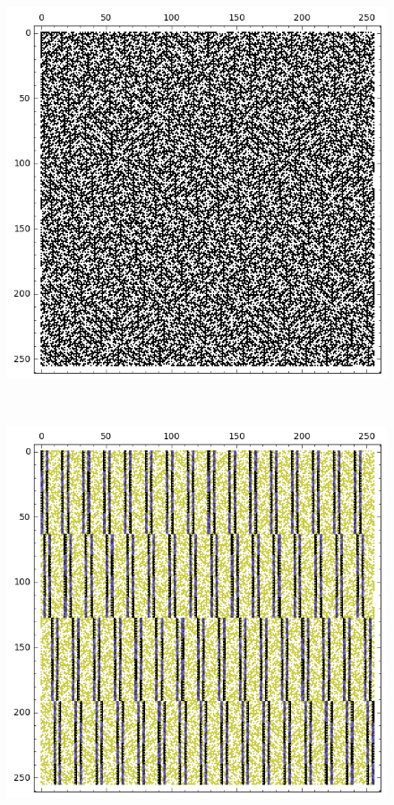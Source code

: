 \documentclass[12pt,a4paper]{article}
\begin{document}
\begin{figure}[!bhpt] %
\centering
\begin{minipage}{.48\textwidth}
  \centering
  \includegraphics[width=.9\linewidth]{../matrix_plot/re8_8_weight_class_matrix.png}
  \label{fig:8_8_weight_class_matrix}
\end{minipage}%
~~~~
\begin{minipage}{.48\textwidth}
  \centering
  \includegraphics[width=.9\linewidth]{../matrix_plot/re8_8_bent_cayley_graph_index_matrix.png}
  \label{fig:8_8_bent_cayley_graph_index_matrix}
\end{minipage}
\end{figure}
~
\end{document}
